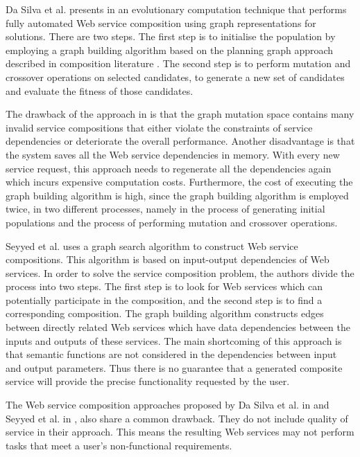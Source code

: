 Da Silva et al. presents in \cite{2} an evolutionary computation technique that performs fully automated Web service composition using graph representations for solutions. There are two steps. The first step is to initialise the population by employing a graph building algorithm based on the planning graph approach described in composition literature \cite{3}. The second step is to perform mutation and crossover operations on selected candidates, to generate a new set of candidates and evaluate the fitness of those candidates.\par
The drawback of the approach in \cite{2} is that the graph mutation space contains many invalid service compositions that either violate the constraints of service dependencies or deteriorate the overall performance. Another disadvantage is that the system saves all the Web service dependencies in memory. With every new service request, this approach needs to regenerate all the dependencies again which incurs expensive computation costs. Furthermore, the cost of executing the graph building algorithm is high, since the graph building algorithm is employed twice, in two different processes, namely in the process of generating initial populations and the process of performing mutation and crossover operations.\par
Seyyed et al. \cite{5} uses a graph search algorithm to construct Web service compositions. This algorithm is based on input-output dependencies of Web services. In order to solve the service composition problem, the authors divide the process into two steps. The first step is to look for Web services which can potentially participate in the composition, and the second step is to find a corresponding composition. The graph building algorithm constructs edges between directly related Web services which have data dependencies between the inputs and outputs of these services. The main shortcoming of this approach is that semantic functions are not considered in the dependencies between input and output parameters. Thus there is no guarantee that a generated composite service will provide the precise functionality requested by the user.\par
The Web service composition approaches proposed by Da Silva et al. in \cite{2} and Seyyed et al. in \cite{5}, also share a common drawback. They do not include quality of service in their approach. This means the resulting Web services may not perform tasks that meet a user's non-functional requirements.\par

